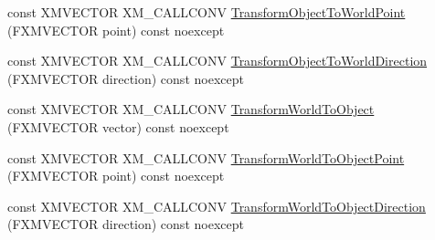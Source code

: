 \begin{DoxyCompactItemize}
\item 
const X\+M\+V\+E\+C\+T\+OR X\+M\+\_\+\+C\+A\+L\+L\+C\+O\+NV \hyperlink{classmage_1_1_transform_node_a0cd8cd0683c141f2632d96bb3c155614}{Transform\+Object\+To\+World\+Point} (F\+X\+M\+V\+E\+C\+T\+OR point) const noexcept
\item 
const X\+M\+V\+E\+C\+T\+OR X\+M\+\_\+\+C\+A\+L\+L\+C\+O\+NV \hyperlink{classmage_1_1_transform_node_aacbb3c43db6a7b67170654e1ffc70892}{Transform\+Object\+To\+World\+Direction} (F\+X\+M\+V\+E\+C\+T\+OR direction) const noexcept
\item 
const X\+M\+V\+E\+C\+T\+OR X\+M\+\_\+\+C\+A\+L\+L\+C\+O\+NV \hyperlink{classmage_1_1_transform_node_a20d7ef8d49095a4ffddf508cad7d89d1}{Transform\+World\+To\+Object} (F\+X\+M\+V\+E\+C\+T\+OR vector) const noexcept
\item 
const X\+M\+V\+E\+C\+T\+OR X\+M\+\_\+\+C\+A\+L\+L\+C\+O\+NV \hyperlink{classmage_1_1_transform_node_a792410956cd6577f3f840341d152ca8a}{Transform\+World\+To\+Object\+Point} (F\+X\+M\+V\+E\+C\+T\+OR point) const noexcept
\item 
const X\+M\+V\+E\+C\+T\+OR X\+M\+\_\+\+C\+A\+L\+L\+C\+O\+NV \hyperlink{classmage_1_1_transform_node_aac30202006ee4ccc2b9e05adb145656b}{Transform\+World\+To\+Object\+Direction} (F\+X\+M\+V\+E\+C\+T\+OR direction) const noexcept
\end{DoxyCompactItemize}
